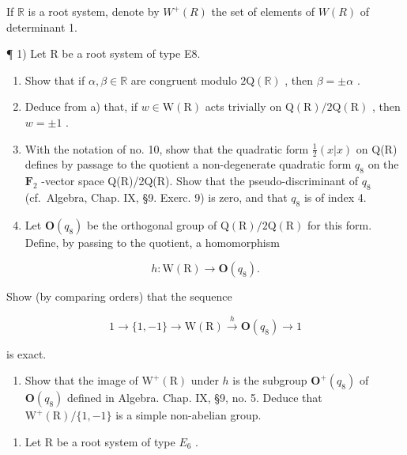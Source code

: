 
If \(\mathbb{R}\) is a root system, denote by \(W^{+}(R)\) the set of elements of \(W(R)\) of determinant 1.

¶ 1) Let R be a root system of type E8.

\begin{enumerate}
\def\labelenumi{\alph{enumi})}
\item
  Show that if \(\alpha, \beta \in \mathbb{R}\) are congruent modulo \(2\mathrm{Q}(\mathbb{R})\) , then \(\beta = \pm \alpha\) .
\item
  Deduce from a) that, if \(w \in \mathrm{W}(\mathrm{R})\) acts trivially on \(\mathrm{Q}(\mathrm{R}) / 2\mathrm{Q}(\mathrm{R})\) , then \(w = \pm 1\) .
\item
  With the notation of no. 10, show that the quadratic form \(\frac{1}{2}(x|x)\) on Q(R) defines by passage to the quotient a non-degenerate quadratic form \(q_{8}\) on the \(\mathbf{F}_2\) -vector space Q(R)/2Q(R). Show that the pseudo-discriminant of \(q_{8}\) (cf.~Algebra, Chap. IX, §9. Exerc. 9) is zero, and that \(q_{8}\) is of index 4.
\item
  Let \(\mathbf{O}(q_{8})\) be the orthogonal group of \(\mathrm{Q}(\mathrm{R})/2\mathrm{Q}(\mathrm{R})\) for this form. Define, by passing to the quotient, a homomorphism
\end{enumerate}

\[
h: \mathrm{W} (\mathrm{R}) \rightarrow \mathbf {O} (q _ {8}).
\]

Show (by comparing orders) that the sequence

\[
1 \rightarrow \{1, - 1 \} \rightarrow \mathrm{W(R)} \stackrel {h} {\longrightarrow} \mathbf {O} (q _ {8}) \rightarrow 1
\]

is exact.

\begin{enumerate}
\def\labelenumi{\alph{enumi})}
\setcounter{enumi}{4}
\tightlist
\item
  Show that the image of \(\mathrm{W}^{+}(\mathrm{R})\) under \(h\) is the subgroup \(\mathbf{O}^{+}(q_{8})\) of \(\mathbf{O}(q_8)\) defined in Algebra. Chap. IX, §9, no. 5. Deduce that \(\mathrm{W}^{+}(\mathrm{R}) / \{1, -1\}\) is a simple non-abelian group.
\end{enumerate}

\begin{enumerate}
\def\labelenumi{\arabic{enumi})}
\setcounter{enumi}{1}
\tightlist
\item
  Let R be a root system of type \(E_{6}\) .
\end{enumerate}

